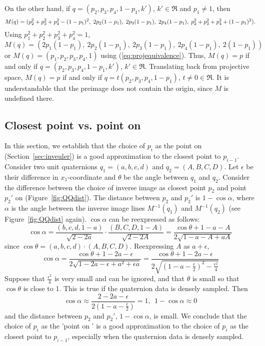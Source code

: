 \documentclass[12pt]{article}
\begin{document}
On the other hand, if $q = (p_2,p_3,p_4,1 - p_1,k')$, $k' \in \Re$
and $p_1 \neq 1$,
then 
\[
\scriptsize{M(q) = (p_2^2 + p_3^2 + p_4^2 - (1 - p_1)^2,\ 
	2p_2 (1 - p_1),\ 2p_3 (1 - p_1),\ 2p_4 (1 - p_1),\ 
	p_2^2 + p_3^2 + p_4^2 + (1 - p_1)^2).}
\]
Using $p_1^2 + p_2^2 + p_3^2 + p_4^2 = 1$,
\[
M(q) = (2p_1(1 - p_1),\ 2p_2 (1 - p_1),\ 2p_3 (1 - p_1),\ 2p_4 (1 - p_1),\ 
2(1 - p_1))
\]
or $M(q) = (p_1,p_2,p_3,p_4,1)$ using (\ref{eq:projequivalence}).
Thus, $M(q) = p$ if and only if 
$q = (p_2,p_3,p_4,1 - p_1,k')$, $k' \in \Re$.
Translating back from projective space,
$M(q) = p$ if and only if 
$q = t(p_2,p_3,p_4, 1-p_1)$, $t \neq 0 \in \Re$.
It is understandable that the preimage does not contain the origin, 
since $M$ is undefined there.
\QED

\subsection{Closest point vs. point on }
\label{sec:closest}

In this section, we establish that the choice of $p_i$ as the point on 
(Section~\ref{sec:inveuler})
is a good approximation to the closest point to $p_{i-1}$.
Consider two unit quaternions $q_1 = (a,b,c,d)$ and $q_2 = (A,B,C,D)$.
Let $\epsilon$ be their difference in $x_1$-coordinate and $\theta$
be the angle between $q_1$ and $q_2$.
Consider the difference between the choice of inverse image as closest point $p_2$
and point $p_2'$ on \Sn{3} (Figure~\ref{fig:QQdist}).
The distance between $p_2$ and $p_2'$ is $1-\cos \alpha$, where
$\alpha$ is the angle between the inverse image lines $M^{-1}(q_1)$ and
$M^{-1}(q_2)$ (see Figure~\ref{fig:QQdist} again).
$\cos \alpha$ can be reexpressed as follows:
\[
	\cos \alpha = \frac{(b,c,d,1-a)}{\sqrt{2-2a}}
	\cdot
	\frac{(B,C,D,1-A)}{\sqrt{2-2A}}
	= \frac{\cos \theta + 1 - a - A}
	       {2\sqrt{1-a-A+aA}}
\]
since $\cos\theta = (a,b,c,d) \cdot (A,B,C,D)$.
Reexpressing $A$ as $a + \epsilon$,
\[
\cos \alpha = \frac{\cos \theta + 1 - 2a - \epsilon}
	       {2\sqrt{1-2a-\epsilon+a^2 + \epsilon a}}
	= \frac{\cos \theta + 1 - 2a - \epsilon}
	       {2\sqrt{(1-a-\frac{\epsilon}{2})^2 - \frac{\epsilon^2}{4}}}
\]
Suppose that $\frac{\epsilon^2}{4}$ is very small and can be ignored,
and that $\theta$ is small so that $\cos \theta$ is close to 1.
This is true if the quaternion data is densely sampled.
Then 
\[
\cos \alpha \approx \frac{2 - 2a - \epsilon}{2(1-a-\frac{\epsilon}{2})} = 1,\ \ 
1-\cos \alpha \approx 0
\]
and the distance between $p_2$ and $p_2'$, $1 - \cos\alpha$, is small.  
We conclude that the choice of $p_i$ as the 'point on \Sn{3}'
is a good approximation to the choice of $p_i$ as the closest point to $p_{i-1}$,
especially when the quaternion data is densely sampled.
\end{document}
